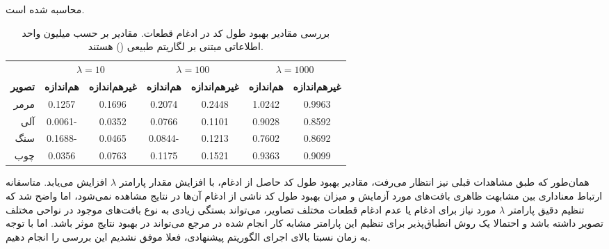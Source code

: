 محاسبه شده است.

\begin{table}[bh]
	\caption[بررسی مقادیر بهبود طول کد در ادغام قطعات]
	{
بررسی مقادیر بهبود طول کد در ادغام قطعات.
مقادیر بر حسب میلیون واحد اطلاعاتی مبتنی بر لگاریتم طبیعی
()
هستند.
	}
	\label{table.improvement_comparison}
	\begin{center}
		{\setlength{\extrarowheight}{5pt}%
			\begin{tabular}{rcccccc}
				\hline%
				&
				\multicolumn{2}{c}{$\lambda=10$}
				&
				\multicolumn{2}{c}{$\lambda=100$}
				&
				\multicolumn{2}{c}{$\lambda=1000$}
				\\
				\textbf{تصویر \hspace{30pt}}
				&
				\textbf{هم‌اندازه}
				&
				\textbf{غیرهم‌اندازه}
				&
				\textbf{هم‌اندازه}
				&
				\textbf{غیرهم‌اندازه}
				&
				\textbf{هم‌اندازه}
				&
				\textbf{غیرهم‌اندازه}
				\\[5pt]\hline
مرمر
& 0.1257    & 0.1696    & 0.2074    & 0.2448    & 1.0242    & 0.9963\\
آلی
& 0.0061-    & 0.0352    & 0.0766    & 0.1101    & 0.9028    & 0.8592\\
سنگ
& 0.1688-    & 0.0465   & 0.0844-    & 0.1213    & 0.7602    & 0.8692\\
چوب
& 0.0356    & 0.0763    & 0.1175    & 0.1521    & 0.9363    & 0.9099
				\\\hline
			\end{tabular}
		}
	\end{center}
\end{table}

همان‌طور که طبق مشاهدات قبلی نیز انتظار می‌رفت، مقادیر بهبود طول کد حاصل از ادغام، با افزایش مقدار پارامتر
$\lambda$
افزایش می‌یابد.
متاسفانه ارتباط معناداری بین مشابهت ظاهری بافت‌های مورد آزمایش و میزان بهبود طول کد ناشی از ادغام آن‌ها در نتایج مشاهده نمی‌شود،
اما واضح شد که تنظیم دقیق پارامتر
$\lambda$
مورد نیاز برای ادغام یا عدم ادغام قطعات مختلف تصاویر، می‌تواند بستگی زیادی به نوع بافت‌های موجود در نواحی مختلف تصویر داشته باشد و احتمالا یک روش انطباق‌پذیر برای تنظیم این پارامتر مشابه کار انجام شده در مرجع
\cite{yang_unsupervised_2008}
می‌تواند در بهبود نتایج موثر باشد.
اما با توجه به زمان نسبتا بالای اجرای الگوریتم پیشنهادی، فعلا موفق نشدیم این بررسی را انجام دهیم.




